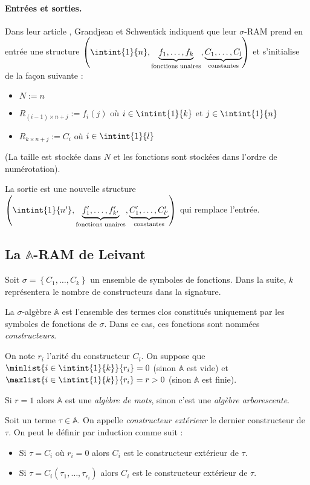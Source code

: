 \documentclass{article}
\newcommand{\bbA}{\mathbb{A}}
\begin{document}
		
		\paragraph{Entrées et sorties.}
		Dans leur article , Grandjean et Schwentick indiquent que leur $\sigma$-RAM prend en entrée une structure $\left( \intint{1}{n}, \underset{\text{fonctions unaires}}{\underbrace{f_1, \dots, f_k}},  \underset{\text{constantes}}{\underbrace{C_1, \dots, C_l}}\right)$ et s'initialise de la façon suivante : 
		
		\begin{itemize}
			\setlength{\itemsep}{-1mm}
			\item 	$N := n$
			\item 	$R_{(i-1) \times n + j} := f_i(j)$ où $i \in \intint{1}{k}$ et $j \in \intint{1}{n}$
			\item 	$R_{k \times n + j} := C_i$ où $i \in \intint{1}{l}$
		\end{itemize}
		(La taille est stockée dans $N$ et les fonctions sont stockées dans l'ordre de numérotation).
		
		La sortie est une nouvelle structure $\left( \intint{1}{n'}, \underset{\text{fonctions unaires}}{\underbrace{f'_1, \dots, f'_{k'}}},  \underset{\text{constantes}}{\underbrace{C'_1, \dots, C'_{l'}}}\right)$ qui remplace l'entrée.
		
		
		
		\subsection{La $\bbA$-RAM de Leivant}
		
		
		\begin{definition}[Algèbre]
			Soit $\sigma = \left\lbrace C_1, \dots, C_k \right\rbrace$ un ensemble de symboles de fonctions. Dans la suite, $k$ représentera le nombre de constructeurs dans la signature.
			
			La $\sigma$-algèbre $\bbA$ est l'ensemble des termes clos constitués uniquement par les symboles de fonctions de $\sigma$. Dans ce cas, ces fonctions sont nommées \emph{constructeurs}. 
			
			On note $r_i$ l'arité du constructeur $C_i$. On suppose que $\minlist{i\in\intint{1}{k}}{r_i} = 0$ (sinon $\bbA$ est vide) et $\maxlist{i\in\intint{1}{k}}{r_i} = r > 0$ (sinon $\bbA$ est finie).
			
			Si $r = 1$ alors $\mathbb{A}$ est une \emph{algèbre de mots}, sinon c'est une \emph{algèbre arborescente}.
			
			Soit un terme $\tau \in \bbA$. On appelle \emph{constructeur extérieur} le dernier constructeur de $\tau$. On peut le définir par induction comme suit :
			
			\begin{itemize}
				\setlength{\itemsep}{-1mm}
				\item 	Si $\tau = C_i$ où $r_i = 0$ alors $C_i$ est le constructeur extérieur de $\tau$.
				\item 	Si $\tau = C_i(\tau_1, \dots, \tau_{r_i})$ alors $C_{i}$ est le constructeur extérieur de $\tau$.
			\end{itemize}
		\end{definition}
		
\end{document}
